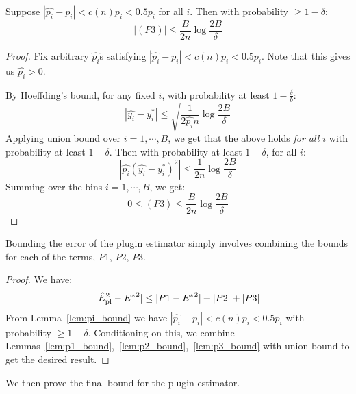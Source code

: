 \begin{lemma}[P3]
\label{lem:p3_bound}
Suppose $|\hat{p_i} - p_i| < c(n)p_i < 0.5p_i$ for all $i$. Then with probability $\geq 1 - \delta$:
\[ |(P3)| \leq \frac{B}{2n} \log{\frac{2B}{\delta}} \]
\end{lemma}

\begin{proof}
Fix arbitrary $\hat{p_i}$s satisfying $|\hat{p_i} - p_i| < c(n) p_i < 0.5p_i$. Note that this gives us $\hat{p_i} > 0$.

By Hoeffding's bound, for any fixed $i$, with probability at least $1-\frac{\delta}{b}$:
\[ |\hat{y_i} - y_i^*| \leq \sqrt{\frac{1}{2\hat{p_i}n} \log{\frac{2B}{\delta}}} \]
Applying union bound over $i = 1, \cdots, B$, we get that the above holds \emph{for all $i$} with probability at least $1 - \delta$. Then with probability at least $1 - \delta$, for all $i$:
\[ | \hat{p_i} (\hat{y_i} - y_i^*)^2 | \leq \frac{1}{2n} \log{\frac{2B}{\delta}} \]
Summing over the bins $i = 1, \cdots, B$, we get:
\[ 0 \leq (P3) \leq \frac{B}{2n} \log{\frac{2B}{\delta}}  \]
\end{proof}


Bounding the error of the plugin estimator simply involves combining the bounds for each of the terms, $P1$, $P2$, $P3$.

\pluginBound*

\begin{proof}
We have:
\[ |\hat{E}_{\textup{pl}}^2{} - {E^*}^2| \leq |P1 - {E^*}^2| + |P2| + |P3| \]
From Lemma~\ref{lem:pi_bound} we have $|\hat{p_i} - p_i| < c(n)p_i < 0.5p_i$ with probability $\geq 1 - \delta$. Conditioning on this, we combine Lemmas~\ref{lem:p1_bound},~\ref{lem:p2_bound},~\ref{lem:p3_bound} with union bound to get the desired result.
\end{proof}

We then prove the final bound for the plugin estimator.

\finalPlugin*

